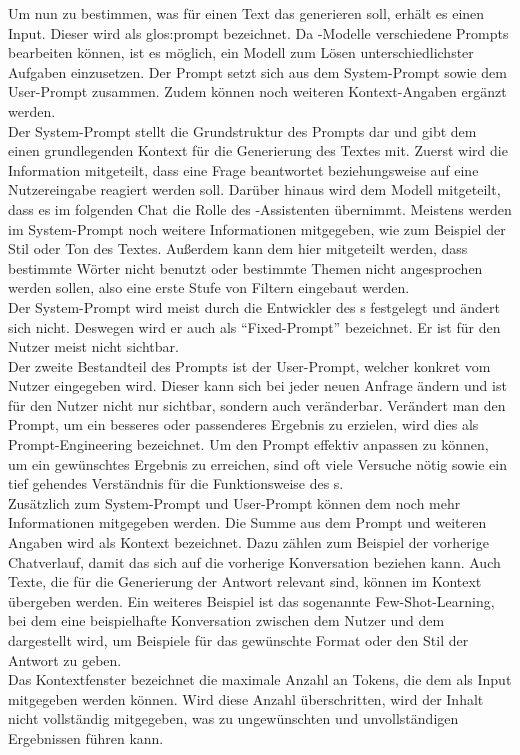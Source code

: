 \documentclass[../main.tex]{subfiles}
\begin{document}
Um nun zu bestimmen, was für einen Text das  generieren soll, erhält es einen Input. Dieser wird als \gls{glos:prompt} bezeichnet. Da -Modelle verschiedene Prompts bearbeiten können, ist es 
möglich, ein Modell zum Lösen unterschiedlichster Aufgaben einzusetzen. Der Prompt setzt sich aus dem System-Prompt sowie dem User-Prompt zusammen. Zudem können noch weiteren Kontext-Angaben 
ergänzt werden.\cite{systemprompt}\\
Der System-Prompt stellt die Grundstruktur des Prompts dar und gibt dem  einen grundlegenden Kontext für die Generierung des Textes mit. Zuerst wird die Information mitgeteilt, dass eine 
Frage beantwortet beziehungsweise auf eine Nutzereingabe reagiert werden soll. Darüber hinaus wird dem Modell mitgeteilt, dass es im folgenden Chat die Rolle des -Assistenten übernimmt. 
Meistens werden im System-Prompt noch weitere Informationen mitgegeben, wie zum Beispiel der Stil oder Ton des Textes. Außerdem kann dem  hier mitgeteilt werden, dass bestimmte Wörter 
nicht benutzt oder bestimmte Themen nicht angesprochen werden sollen, also eine erste Stufe von Filtern eingebaut werden.\cite{systemprompt}\\
Der System-Prompt wird meist durch die Entwickler des s festgelegt und ändert sich nicht. Deswegen wird er auch als "`Fixed-Prompt"' bezeichnet. Er ist für den Nutzer meist nicht sichtbar.\\
Der zweite Bestandteil des Prompts ist der User-Prompt, welcher konkret vom Nutzer eingegeben wird. Dieser kann sich bei jeder neuen Anfrage ändern und ist für den Nutzer nicht nur sichtbar, sondern 
auch veränderbar. Verändert man den Prompt, um ein besseres oder passenderes Ergebnis zu erzielen, wird dies als Prompt-Engineering bezeichnet. Um den Prompt effektiv anpassen zu können, um 
ein gewünschtes Ergebnis zu erreichen, sind oft viele Versuche nötig sowie ein tief gehendes Verständnis für die Funktionsweise des s.\cite{promptengineering}\\
Zusätzlich zum System-Prompt und User-Prompt können dem  noch mehr Informationen mitgegeben werden. Die Summe aus dem Prompt und weiteren Angaben wird als Kontext bezeichnet. Dazu zählen 
zum Beispiel der vorherige Chatverlauf, damit das  sich auf die vorherige Konversation beziehen kann. Auch Texte, die für die Generierung der Antwort relevant sind, können im Kontext 
übergeben werden. Ein weiteres Beispiel ist das sogenannte Few-Shot-Learning, bei dem eine  beispielhafte Konversation zwischen dem Nutzer und dem  dargestellt wird, um Beispiele für das 
gewünschte Format oder den Stil der Antwort zu geben.\\
Das Kontextfenster bezeichnet die maximale Anzahl an Tokens, die dem  als Input mitgegeben werden können. Wird diese Anzahl überschritten, wird der Inhalt nicht vollständig mitgegeben, 
was zu ungewünschten und unvollständigen Ergebnissen führen kann.
\end{document}
